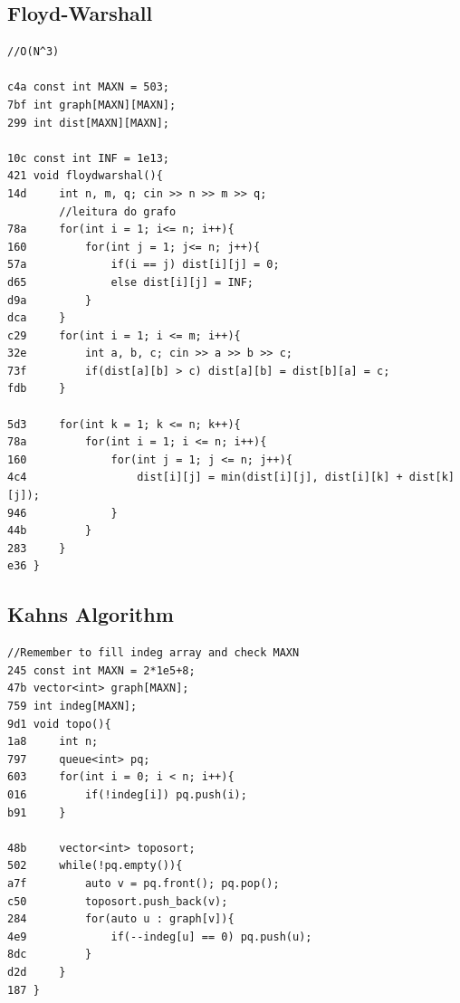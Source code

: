 \documentclass[11pt, a4paper, twoside]{article}
\begin{document}
\subsection{Floyd-Warshall}
\begin{lstlisting}
//O(N^3)

c4a const int MAXN = 503;
7bf int graph[MAXN][MAXN];
299 int dist[MAXN][MAXN];
 
10c const int INF = 1e13;
421 void floydwarshal(){
14d     int n, m, q; cin >> n >> m >> q;
        //leitura do grafo
78a     for(int i = 1; i<= n; i++){
160         for(int j = 1; j<= n; j++){
57a             if(i == j) dist[i][j] = 0;
d65             else dist[i][j] = INF;
d9a         }
dca     }
c29     for(int i = 1; i <= m; i++){
32e         int a, b, c; cin >> a >> b >> c;
73f         if(dist[a][b] > c) dist[a][b] = dist[b][a] = c; 
fdb     }
     
5d3     for(int k = 1; k <= n; k++){
78a         for(int i = 1; i <= n; i++){
160             for(int j = 1; j <= n; j++){
4c4                 dist[i][j] = min(dist[i][j], dist[i][k] + dist[k][j]);
946             }
44b         }
283     }
e36 }
\end{lstlisting}

\subsection{Kahns Algorithm }
\begin{lstlisting}
//Remember to fill indeg array and check MAXN
245 const int MAXN = 2*1e5+8;
47b vector<int> graph[MAXN];
759 int indeg[MAXN];
9d1 void topo(){
1a8     int n;
797     queue<int> pq;
603     for(int i = 0; i < n; i++){
016         if(!indeg[i]) pq.push(i);
b91     }
    
48b     vector<int> toposort;
502     while(!pq.empty()){
a7f         auto v = pq.front(); pq.pop();
c50         toposort.push_back(v);
284         for(auto u : graph[v]){
4e9             if(--indeg[u] == 0) pq.push(u);
8dc         }
d2d     }
187 }
\end{lstlisting}
\end{document}
